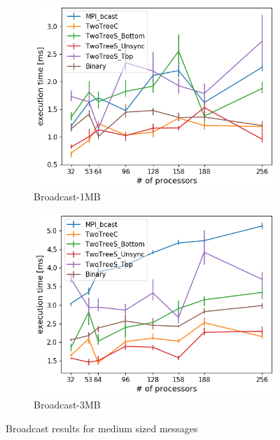\documentclass[sigplan,review,anonymous]{acmart}\settopmatter{printfolios=true,printccs=false,printacmref=false}
\begin{document}
\begin{figure}
\centering
\begin{subfigure}{.25\textwidth}
  \centering
  \includegraphics[width=1\linewidth]{images/Results/bcastFinal_1048576B.png}
  \caption{Broadcast-1MB}
  \label{bcast-selected-3MB}
\end{subfigure}%
\begin{subfigure}{.25\textwidth}
  \centering
  \includegraphics[width=1\linewidth]{images/Results/bcastFinal_3145728B.png}
  \caption{Broadcast-3MB}
  \label{bcast-selected-3MB}
\end{subfigure}
\caption{Broadcast results for medium sized messages}
\label{graph-bcast-medium1-selected}
\end{figure}
\end{document}
